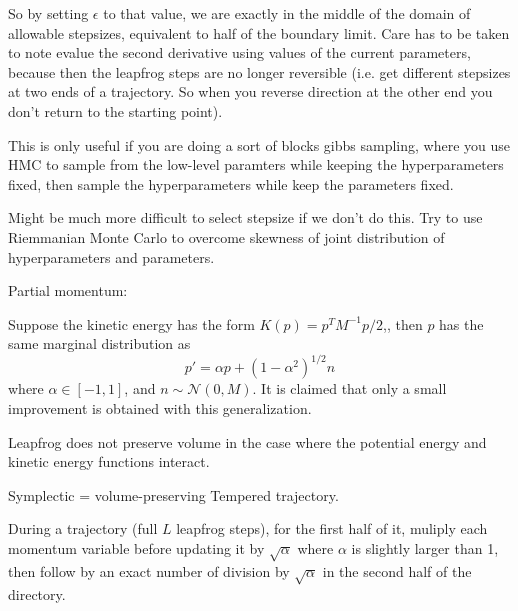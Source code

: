 \documentclass{book}
\begin{document}
\begin{enumerate}
So by setting $\epsilon$ to that value, we are exactly in the middle of the domain of allowable stepsizes, equivalent to half of the boundary limit.
Care has to be taken to note evalue the second derivative using values of the current parameters, because then the leapfrog steps are no longer reversible (i.e. get different stepsizes at two ends of a trajectory. So when you reverse direction at the other end you don't return to  the starting point). 

This is only useful if you are doing a sort of blocks gibbs sampling, where you use HMC to sample from the low-level paramters while keeping the hyperparameters fixed, then sample the hyperparameters while keep the parameters fixed. 

Might be much more difficult to select stepsize if we don't do this. Try to use Riemmanian Monte Carlo to overcome skewness of joint distribution of hyperparameters and parameters. 

Partial momentum:

Suppose the kinetic energy has the form $K(p) = p^TM^{-1}p/2$,, then $p$ has the same marginal distribution as 
\[ p' = \alpha p + (1-\alpha^2)^{1/2} n \]
where $\alpha \in [-1,1]$, and $n \sim \mathcal{N}(0,M)$. 
It is claimed that only a small improvement is obtained with this generalization.

Leapfrog does not preserve volume in the case where the potential energy and kinetic energy functions interact.

Symplectic  = volume-preserving
Tempered trajectory. 

During a trajectory (full $L$ leapfrog steps), for the first half of it, muliply
each momentum variable before updating it by $\sqrt{\alpha}$ where $\alpha$ is slightly larger than
1, then follow by an exact number of division by $\sqrt{\alpha}$ in the second
half of the directory. \cite{neal1996sampling}

\end{enumerate}
\end{document}
